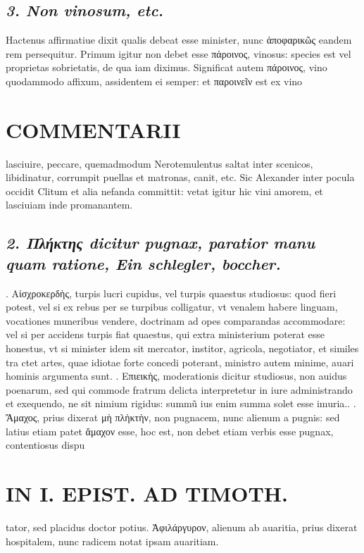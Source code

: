 \documentclass{article}
\begin{document}
\begin{pages}
\subsection*{\textit{3. Non vinosum, etc. }}\pstart Hactenus affirmatiue dixit qualis debeat esse minister, nunc ἀποφαρικῶς eandem rem persequitur. Primum igitur non debet esse πάροινος, vinosus: species est vel proprietas sobrietatis, de qua iam diximus. Significat autem πάροινος, vino quodammodo affixum, assidentem ei semper: et παροινεῖν est ex vino  \pend
\section*{COMMENTARII }
\marginpar{[ p.66 ]}\pstart lasciuire, peccare, quemadmodum Nerotemulentus saltat inter scenicos, libidinatur, corrumpit puellas et matronas, canit, etc. Sic Alexander inter pocula occidit Clitum et alia nefanda committit: vetat igitur hic vini amorem, et lasciuiam inde promanantem.  \pend
{}
{}
\subsection*{\textit{2. Πλήκτης dicitur pugnax, paratior manu quam ratione, Ein schlegler, boccher. }}. Αἰσχροκερδὴς, turpis lucri cupidus, vel turpis quaestus studiosus: quod fieri potest, vel si ex rebus per se turpibus colligatur, vt venalem habere linguam, vocationes muneribus vendere, doctrinam ad opes comparandas accommodare: vel si per accidens turpis fiat quaestus, qui extra ministerium poterat esse honestus, vt si minister idem sit mercator, institor, agricola, negotiator, et similes tra ctet artes, quae idiotae forte concedi poterant, ministro autem minime, auari hominis argumenta sunt.  \pend{}. Επιεικὴς, moderationis dicitur studiosus, non auidus poenarum, sed qui commode fratrum delicta interpretetur in iure administrando et exequendo, ne sit nimium rigidus: summũ ius enim summa solet esse imuria..  \pend{}. Ἄμαχος, prius dixerat μὴ πλήκτὴν, non pugnacem, nunc alienum a pugnis: sed latius etiam patet ἄμαχον esse, hoc est, non debet etiam verbis esse pugnax, contentiosus dispu\pend
\section*{IN I. EPIST. AD TIMOTH. }
\marginpar{[ p.67 ]}\pstart tator, sed placidus doctor potius.  \pend{} Ἀφιλάργυρον, alienum ab auaritia, prius dixerat hospitalem, nunc radicem notat ipsam auaritiam.  \pend
{}
{}

\end{pages}
\end{document}
